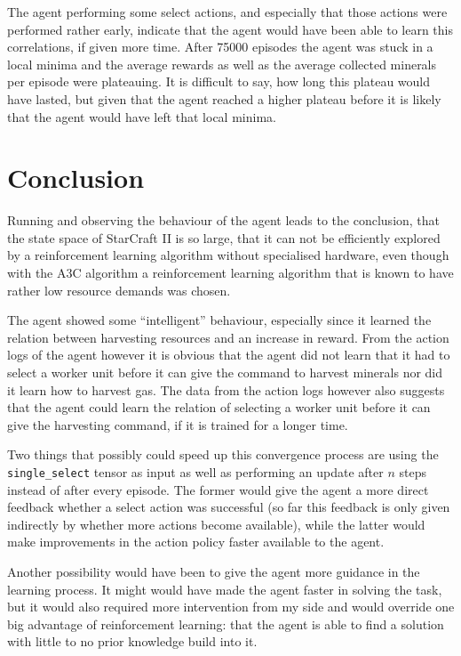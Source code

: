 \documentclass{article}
\begin{document}
The agent performing some select actions, and especially that those actions 
were performed rather early, indicate that the agent would have been able to 
learn this correlations, if given more time. After 75000 episodes the agent was 
stuck in a local minima and the average rewards as well as the average 
collected minerals per episode were plateauing. It is difficult to say, how 
long this plateau would have lasted, but given that the agent reached a higher 
plateau before it is likely that the agent would have left that local minima.

\section{Conclusion}
Running and observing the behaviour of the agent leads to the conclusion, that 
the state space of StarCraft II is so large, that it can not be efficiently 
explored by a reinforcement learning algorithm without specialised hardware, 
even though with the A3C algorithm a reinforcement learning algorithm that is 
known to have rather low resource demands was chosen.

The agent showed some ``intelligent'' behaviour, especially since it learned 
the relation between harvesting resources and an increase in reward. From the 
action logs of the agent however it is obvious that the agent did not learn 
that it had to select a worker unit before it can give the command to harvest 
minerals nor did it learn how to harvest gas. The data from the action logs 
however also suggests that the agent could learn the relation of selecting a 
worker unit before it can give the harvesting command, if it is trained for a 
longer time.

Two things that possibly could speed up this convergence process are using the 
\texttt{single\_select} tensor as input as well as performing an update after 
$n$ steps instead of after every episode. The former would give the agent a 
more direct feedback whether a select action was successful (so far this 
feedback is only given indirectly by whether more actions become available), 
while the latter would make improvements in the action policy faster available 
to the agent.

Another possibility would have been to give the agent more guidance in the 
learning process. It might would have made the agent faster in solving the 
task, but it would also required more intervention from my side and would 
override one big advantage of reinforcement learning: that the agent is able to 
find a solution with little to no prior knowledge build into it.
\end{document}
